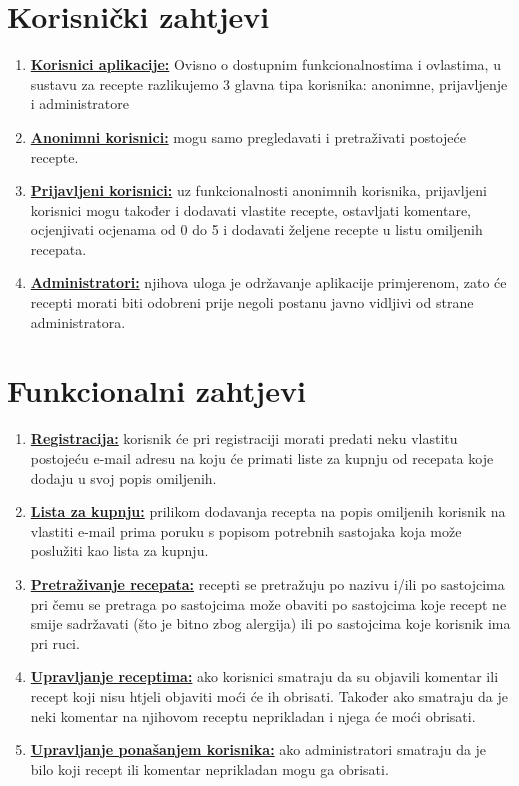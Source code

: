 \documentclass[times, utf8, zavrsni]{fer}
\begin{document}
\section{Korisnički zahtjevi}
\begin{enumerate}
      \item \textbf{\underline{Korisnici aplikacije:}} Ovisno o dostupnim funkcionalnostima i ovlastima,
            u sustavu za recepte razlikujemo 3 glavna tipa korisnika: anonimne, prijavljenje i administratore
      \item \textbf{\underline{Anonimni korisnici:}} mogu samo pregledavati i pretraživati
            postojeće recepte.
      \item \textbf{\underline{Prijavljeni korisnici:}} uz funkcionalnosti
            anonimnih korisnika, prijavljeni korisnici mogu također i dodavati vlastite recepte, ostavljati komentare,
            ocjenjivati ocjenama od 0 do 5 i dodavati željene recepte u listu omiljenih recepata.
      \item \textbf{\underline{Administratori:}} njihova uloga je održavanje
            aplikacije primjerenom, zato će recepti morati biti odobreni prije negoli postanu javno vidljivi
            od strane administratora.
\end{enumerate}

\section{Funkcionalni zahtjevi}
\begin{enumerate}
      \item \textbf{\underline{Registracija:}} korisnik će pri registraciji morati predati neku vlastitu
            postojeću e-mail adresu na koju će primati liste za kupnju od recepata koje dodaju u svoj popis omiljenih.
      \item \textbf{\underline{Lista za kupnju:}} prilikom dodavanja recepta na popis omiljenih
            korisnik na vlastiti e-mail prima poruku s popisom potrebnih sastojaka koja
            može poslužiti kao lista za kupnju.
      \item \textbf{\underline{Pretraživanje recepata:}} recepti se pretražuju po nazivu i/ili po sastojcima pri čemu se pretraga po
            sastojcima može obaviti po sastojcima koje recept ne smije sadržavati (što je bitno zbog
            alergija) ili po sastojcima koje korisnik ima pri ruci.
      \item \textbf{\underline{Upravljanje receptima:}} ako korisnici smatraju da su objavili komentar ili recept
            koji nisu htjeli objaviti moći će ih obrisati. Također ako smatraju da je neki komentar na njihovom receptu
            neprikladan i njega će moći obrisati.
      \item \textbf{\underline{Upravljanje ponašanjem korisnika:}} ako administratori smatraju da je bilo koji
            recept ili komentar neprikladan mogu ga obrisati.
\end{enumerate}
\end{document}
